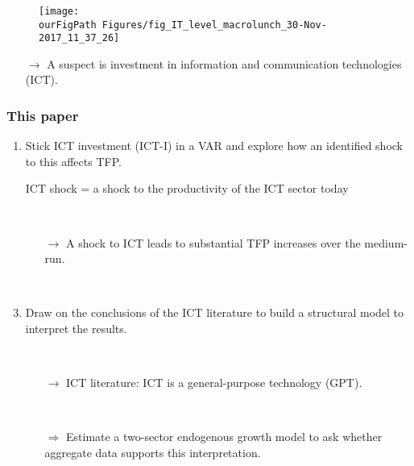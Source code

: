 \documentclass{beamer}
\def \ourFigPath {../../}
\begin{document}
\begin{frame}
	\frametitle{}
	
		\noindent
	\begin{figure}
		\centering
		\texttt{[image: \\ourFigPath Figures/fig\_IT\_level\_macrolunch\_30-Nov-2017\_11\_37\_26]}
	\end{figure}
	
	\begin{itemize}
		
		\item [$\rightarrow$] A suspect is investment in information and communication technologies (ICT).
	
	
	\end{itemize} 

\end{frame}


\begin{frame}
	\frametitle{This paper}
	
	\begin{enumerate}
	\item Stick ICT investment (ICT-I) in a VAR and explore how an identified shock to this affects TFP.
	\item [] ICT shock = a shock to the productivity of the ICT sector today
	
	\
	
	\begin{itemize}
	\item [$\rightarrow$] A shock to ICT leads to substantial TFP increases over the medium-run.
	\end{itemize}

\
	
    \item Draw on the conclusions of the ICT literature to build a structural model to interpret the results. 
    
    \
    
    	\begin{itemize}
	\item [$\rightarrow$] ICT literature: ICT is a general-purpose technology (GPT).
	
	\
	
	\item[$\Rightarrow$] Estimate a two-sector endogenous growth model to ask whether aggregate data supports this interpretation. 
	\end{itemize}
	
	\end{enumerate} 

\end{frame}
\end{document}
